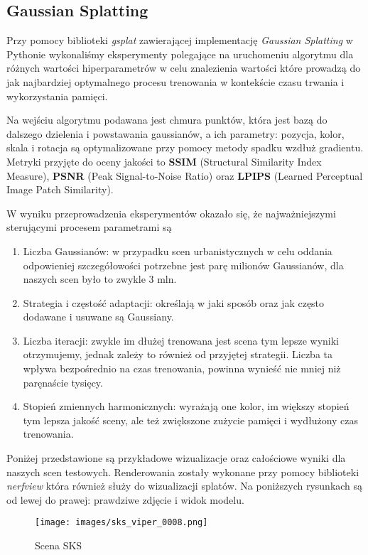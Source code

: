 \subsection{Gaussian Splatting}
Przy pomocy biblioteki \textit{gsplat}\cite{ye2024gsplatopensourcelibrarygaussian} zawierającej implementację \textit{Gaussian Splatting} w Pythonie wykonaliśmy eksperymenty polegające na uruchomeniu algorytmu dla różnych wartości hiperparametrów w celu znalezienia wartości które prowadzą do jak najbardziej optymalnego procesu trenowania w kontekście czasu trwania i wykorzystania pamięci. 

Na wejściu algorytmu podawana jest chmura punktów, która jest bazą do dalszego dzielenia i powstawania gaussianów, a ich parametry: pozycja, kolor, skala i rotacja są optymalizowane przy pomocy metody spadku wzdłuż gradientu. Metryki przyjęte do oceny jakości to \textbf{SSIM} (Structural Similarity Index Measure), \textbf{PSNR} (Peak Signal-to-Noise Ratio) oraz \textbf{LPIPS} (Learned Perceptual Image Patch Similarity).

W wyniku przeprowadzenia eksperymentów okazało się, że najważniejszymi sterującymi procesem parametrami są 
\begin{enumerate}
    \item Liczba Gaussianów: w przypadku scen urbanistycznych w celu oddania odpowieniej szczegółowości potrzebne jest parę milionów Gaussianów, dla naszych scen było to zwykle 3 mln.
    \item Strategia i częstość adaptacji: określają w jaki sposób oraz jak często dodawane i usuwane są Gaussiany. 
    \item Liczba iteracji: zwykle im dłużej trenowana jest scena tym lepsze wyniki otrzymujemy, jednak zależy to również od przyjętej strategii. Liczba ta wpływa bezpośrednio na czas trenowania, powinna wynieść nie mniej niż paręnaście tysięcy.
    \item Stopień zmiennych harmonicznych: wyrażają one kolor, im większy stopień tym lepsza jakość sceny, ale też zwiększone zużycie pamięci i wydłużony czas trenowania. 
\end{enumerate}

Poniżej przedstawione są przykładowe wizualizacje oraz całościowe wyniki dla naszych scen testowych. Renderowania zostały wykonane przy pomocy biblioteki \textit{nerfview} która również służy do wizualizacji splatów. Na poniższych rysunkach są od lewej do prawej: prawdziwe zdjęcie i widok modelu.

\begin{figure}[!h]
    \centering
    \texttt{[image: images/sks\_viper\_0008.png]}
    \caption{Scena SKS}
    \label{fig:sks_gs}
\end{figure}

